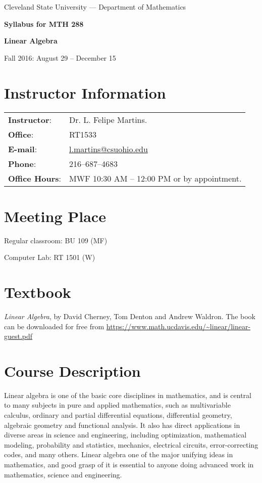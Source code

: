 \documentclass[11pt]{article}
\begin{document}
\sffamily

\begin{center}

{\large Cleveland State University --- Department of Mathematics}

\bigskip
{\Large \textbf{Syllabus for MTH 288}}

\medskip 
{\Large \textbf{Linear Algebra}}

\medskip
Fall 2016: August 29 -- December 15
\end{center}

\section{Instructor Information}
\begin{tabular}{ll}
\textbf{Instructor}: & Dr. L. Felipe Martins.\\
\textbf{Office}: &  RT1533\\
\textbf{E-mail}: &  \href{mailto:l.martins@csuohio.edu}{l.martins@csuohio.edu}\\
\textbf{Phone}: & 216--687--4683 \\
\textbf{Office Hours}: & MWF 10:30 AM -- 12:00 PM or by appointment.\\
\end{tabular}

\section{Meeting Place}

Regular classroom: BU 109 (MF)

Computer Lab: RT 1501 (W)

\section{Textbook}

\emph{Linear Algebra}, by David Cherney, Tom Denton and Andrew Waldron. The book can be downloaded for free from \url{https://www.math.ucdavis.edu/~linear/linear-guest.pdf}

\section{Course Description}
Linear algebra is one of the basic core disciplines in mathematics, and is central to many subjects in pure and applied mathematics, such as multivariable calculus, ordinary and partial differential equations, differential geometry, algebraic geometry and functional analysis. It also has direct applications in diverse areas in science and engineering, including optimization, mathematical modeling, probability and statistics, mechanics, electrical circuits, error-correcting codes, and many others. Linear algebra one of the major unifying ideas in mathematics, and good grasp of it is essential to anyone doing advanced work in mathematics, science and engineering.
\end{document}

